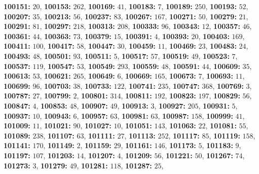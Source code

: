 \textsf{\bfseries 100151:} $20$, \textsf{\bfseries 100153:} $262$, \textsf{\bfseries 100169:} $41$, \textsf{\bfseries 100183:} $7$, \textsf{\bfseries 100189:} $250$, \textsf{\bfseries 100193:} $52$, \textsf{\bfseries 100207:} $35$, \textsf{\bfseries 100213:} $56$, \textsf{\bfseries 100237:} $83$, \textsf{\bfseries 100267:} $167$, \textsf{\bfseries 100271:} $50$, \textsf{\bfseries 100279:} $21$, \textsf{\bfseries 100291:} $81$, \textsf{\bfseries 100297:} $218$, \textsf{\bfseries 100313:} $208$, \textsf{\bfseries 100333:} $96$, \textsf{\bfseries 100343:} $12$, \textsf{\bfseries 100357:} $46$, \textsf{\bfseries 100361:} $44$, \textsf{\bfseries 100363:} $73$, \textsf{\bfseries 100379:} $15$, \textsf{\bfseries 100391:} $4$, \textsf{\bfseries 100393:} $20$, \textsf{\bfseries 100403:} $169$, \textsf{\bfseries 100411:} $100$, \textsf{\bfseries 100417:} $58$, \textsf{\bfseries 100447:} $30$, \textsf{\bfseries 100459:} $11$, \textsf{\bfseries 100469:} $23$, \textsf{\bfseries 100483:} $24$, \textsf{\bfseries 100493:} $48$, \textsf{\bfseries 100501:} $93$, \textsf{\bfseries 100511:} $5$, \textsf{\bfseries 100517:} $57$, \textsf{\bfseries 100519:} $49$, \textsf{\bfseries 100523:} $7$, \textsf{\bfseries 100537:} $119$, \textsf{\bfseries 100547:} $53$, \textsf{\bfseries 100549:} $293$, \textsf{\bfseries 100559:} $48$, \textsf{\bfseries 100591:} $44$, \textsf{\bfseries 100609:} $35$, \textsf{\bfseries 100613:} $53$, \textsf{\bfseries 100621:} $265$, \textsf{\bfseries 100649:} $6$, \textsf{\bfseries 100669:} $165$, \textsf{\bfseries 100673:} $7$, \textsf{\bfseries 100693:} $11$, \textsf{\bfseries 100699:} $96$, \textsf{\bfseries 100703:} $38$, \textsf{\bfseries 100733:} $122$, \textsf{\bfseries 100741:} $235$, \textsf{\bfseries 100747:} $368$, \textsf{\bfseries 100769:} $3$, \textsf{\bfseries 100787:} $27$, \textsf{\bfseries 100799:} $2$, \textsf{\bfseries 100801:} $314$, \textsf{\bfseries 100811:} $192$, \textsf{\bfseries 100823:} $197$, \textsf{\bfseries 100829:} $56$, \textsf{\bfseries 100847:} $4$, \textsf{\bfseries 100853:} $48$, \textsf{\bfseries 100907:} $49$, \textsf{\bfseries 100913:} $3$, \textsf{\bfseries 100927:} $205$, \textsf{\bfseries 100931:} $5$, \textsf{\bfseries 100937:} $10$, \textsf{\bfseries 100943:} $6$, \textsf{\bfseries 100957:} $63$, \textsf{\bfseries 100981:} $63$, \textsf{\bfseries 100987:} $158$, \textsf{\bfseries 100999:} $41$, \textsf{\bfseries 101009:} $11$, \textsf{\bfseries 101021:} $90$, \textsf{\bfseries 101027:} $10$, \textsf{\bfseries 101051:} $143$, \textsf{\bfseries 101063:} $22$, \textsf{\bfseries 101081:} $55$, \textsf{\bfseries 101089:} $238$, \textsf{\bfseries 101107:} $63$, \textsf{\bfseries 101111:} $27$, \textsf{\bfseries 101113:} $252$, \textsf{\bfseries 101117:} $85$, \textsf{\bfseries 101119:} $158$, \textsf{\bfseries 101141:} $170$, \textsf{\bfseries 101149:} $2$, \textsf{\bfseries 101159:} $29$, \textsf{\bfseries 101161:} $146$, \textsf{\bfseries 101173:} $5$, \textsf{\bfseries 101183:} $9$, \textsf{\bfseries 101197:} $107$, \textsf{\bfseries 101203:} $14$, \textsf{\bfseries 101207:} $4$, \textsf{\bfseries 101209:} $56$, \textsf{\bfseries 101221:} $50$, \textsf{\bfseries 101267:} $74$, \textsf{\bfseries 101273:} $3$, \textsf{\bfseries 101279:} $49$, \textsf{\bfseries 101281:} $118$, \textsf{\bfseries 101287:} $25$, 
